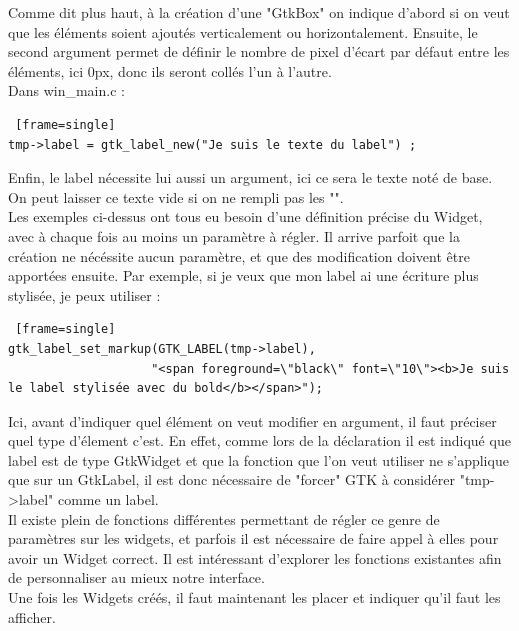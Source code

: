 \documentclass[11pt,french,a4paper]{report}
\begin{document}
Comme dit plus haut, à la création d'une "GtkBox" on indique d'abord si on veut que les éléments soient ajoutés verticalement 
ou horizontalement. Ensuite, le second argument permet de définir le nombre de pixel d'écart par défaut entre les éléments, 
ici 0px, donc ils seront collés l'un à l'autre.  \\

Dans win\_main.c :
\begin{lstlisting} [frame=single]
tmp->label = gtk_label_new("Je suis le texte du label") ; 
\end{lstlisting}
Enfin, le label nécessite lui aussi un argument, ici ce sera le texte noté de base. 
On peut laisser ce texte vide si on ne rempli pas les "".  \\


Les exemples ci-dessus ont tous eu besoin d'une définition précise du Widget, avec à chaque fois au moins un paramètre à régler. 
Il arrive parfoit que la création ne nécéssite aucun paramètre, et que des modification doivent être apportées ensuite. 
Par exemple, si je veux que mon label ai une écriture plus stylisée, je peux utiliser :  \\

\begin{lstlisting} [frame=single]
gtk_label_set_markup(GTK_LABEL(tmp->label), 
                    "<span foreground=\"black\" font=\"10\"><b>Je suis le label stylisée avec du bold</b></span>"); 
\end{lstlisting}

Ici, avant d'indiquer quel élément on veut modifier en argument, il faut préciser quel type d'élement c'est.
En effet, comme lors de la déclaration il est indiqué que label est de type GtkWidget et que la fonction que l'on veut utiliser 
ne s'applique que sur un GtkLabel, il est donc nécessaire de "forcer" GTK à considérer "tmp->label" comme un label.\\

Il existe plein de fonctions différentes permettant de régler ce genre de paramètres sur les widgets, et parfois il est nécessaire 
de faire appel à elles pour avoir un Widget correct. 
Il est intéressant d'explorer les fonctions existantes afin de personnaliser au mieux notre interface. \\

Une fois les Widgets créés, il faut maintenant les placer et indiquer qu'il faut les afficher. \\ 
 
\end{document}

